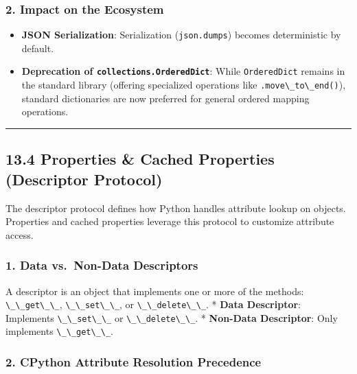 \hypertarget{impact-on-the-ecosystem}{%
\subsubsection{2. Impact on the
Ecosystem}\label{impact-on-the-ecosystem}}

\begin{itemize}
\tightlist
\item
  \textbf{JSON Serialization}: Serialization
  (\passthrough{\lstinline!json.dumps!}) becomes deterministic by
  default.
\item
  \textbf{Deprecation of
  \passthrough{\lstinline!collections.OrderedDict!}}: While
  \passthrough{\lstinline!OrderedDict!} remains in the standard library
  (offering specialized operations like
  \passthrough{\lstinline!.move\_to\_end()!}), standard dictionaries are
  now preferred for general ordered mapping operations.
\end{itemize}

\begin{center}\rule{0.5\linewidth}{0.5pt}\end{center}

\hypertarget{properties-cached-properties-descriptor-protocol}{%
\subsection{13.4 Properties \& Cached Properties (Descriptor
Protocol)}\label{properties-cached-properties-descriptor-protocol}}

The descriptor protocol defines how Python handles attribute lookup on
objects. Properties and cached properties leverage this protocol to
customize attribute access.

\hypertarget{data-vs.-non-data-descriptors}{%
\subsubsection{1. Data vs.~Non-Data
Descriptors}\label{data-vs.-non-data-descriptors}}

A descriptor is an object that implements one or more of the methods:
\passthrough{\lstinline!\_\_get\_\_!},
\passthrough{\lstinline!\_\_set\_\_!}, or
\passthrough{\lstinline!\_\_delete\_\_!}. * \textbf{Data Descriptor}:
Implements \passthrough{\lstinline!\_\_set\_\_!} or
\passthrough{\lstinline!\_\_delete\_\_!}. * \textbf{Non-Data
Descriptor}: Only implements \passthrough{\lstinline!\_\_get\_\_!}.

\hypertarget{cpython-attribute-resolution-precedence}{%
\subsubsection{2. CPython Attribute Resolution
Precedence}\label{cpython-attribute-resolution-precedence}}

